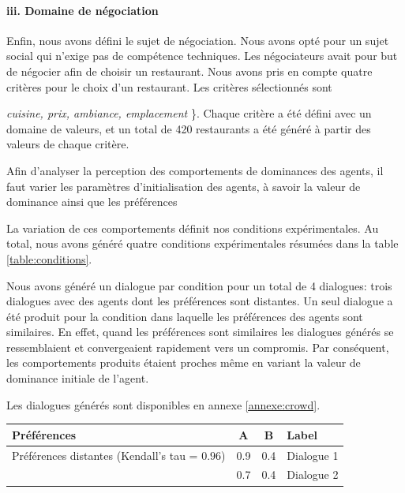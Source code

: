 				\paragraph{iii. Domaine de négociation}
				
				Enfin, nous avons défini le sujet de négociation. Nous avons opté pour un sujet social qui n'exige pas de compétence techniques. Les négociateurs avait pour but de négocier afin de choisir un restaurant. Nous avons pris en compte quatre critères pour le choix d'un restaurant. 	Les critères sélectionnés sont \ {\textit {cuisine, prix, ambiance, emplacement} \}. Chaque critère a été défini avec un domaine de valeurs, et un total de 420 restaurants a été généré à partir des valeurs de chaque critère.
				
				Afin d'analyser la perception des comportements de dominances des agents, il faut varier les paramètres d'initialisation des agents, à savoir la valeur de dominance ainsi que les préférences
				
				La variation de ces comportements définit nos conditions expérimentales. 
				Au total, nous avons généré quatre conditions expérimentales résumées dans la table \ref{table:conditions}. 
				
				Nous avons généré un dialogue par condition pour un total de 4 dialogues: trois dialogues avec des agents dont les préférences sont distantes. Un seul dialogue a été produit pour la condition dans laquelle les préférences des agents sont similaires. En effet, quand les préférences sont similaires les dialogues générés se ressemblaient et convergeaient rapidement vers un compromis. Par conséquent, les comportements produits étaient proches même en variant la valeur de dominance initiale de l'agent.   
				
				Les dialogues générés sont disponibles en annexe \ref{annexe:crowd}.
				
				\begin{table}[h]
					\centering
					\begin{tabular}{ |l|c|c|l| }
						\hline
						\textbf{Préférences}& \textbf{A} & \textbf{B} & \textbf{Label} \\ 
						\hline
						\newline\multirow{3}{*} {Préférences distantes (Kendall's tau = $0.96$)} & 0.9 & 0.4 & Dialogue 1 \\ \cline{2-4}
						
						\newline  & 0.7 & 0.4 & Dialogue 2\\ \cline{2-4}
						

\end{tabular}
\end{table}}
